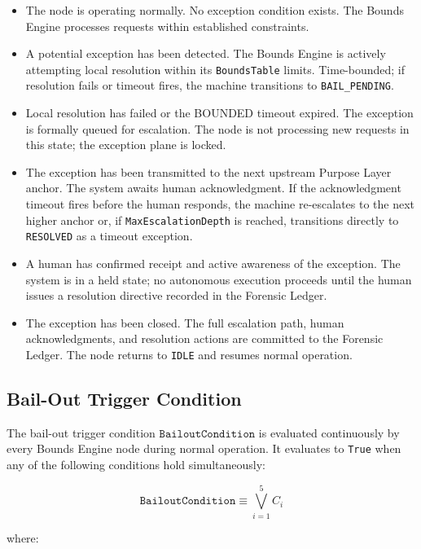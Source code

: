 \begin{itemize}
    \item[\texttt{IDLE}] The node is operating normally. No exception condition exists. The Bounds Engine processes requests within established constraints.
    \item[\texttt{BOUNDED}] A potential exception has been detected. The Bounds Engine is actively attempting local resolution within its \texttt{BoundsTable} limits. Time-bounded; if resolution fails or timeout fires, the machine transitions to \texttt{BAIL\_PENDING}.
    \item[\texttt{BAIL\_PENDING}] Local resolution has failed or the BOUNDED timeout expired. The exception is formally queued for escalation. The node is not processing new requests in this state; the exception plane is locked.
    \item[\texttt{ESCALATING}] The exception has been transmitted to the next upstream Purpose Layer anchor. The system awaits human acknowledgment. If the acknowledgment timeout fires before the human responds, the machine re-escalates to the next higher anchor or, if \texttt{MaxEscalationDepth} is reached, transitions directly to \texttt{RESOLVED} as a timeout exception.
    \item[\texttt{HUMAN\_ACKNOWLEDGED}] A human has confirmed receipt and active awareness of the exception. The system is in a held state; no autonomous execution proceeds until the human issues a resolution directive recorded in the Forensic Ledger.
    \item[\texttt{RESOLVED}] The exception has been closed. The full escalation path, human acknowledgments, and resolution actions are committed to the Forensic Ledger. The node returns to \texttt{IDLE} and resumes normal operation.
\end{itemize}

\subsection{Bail-Out Trigger Condition}

The bail-out trigger condition $\texttt{BailoutCondition}$ is evaluated continuously by every Bounds Engine node during normal operation. It evaluates to \texttt{True} when any of the following conditions hold simultaneously:

\[
\texttt{BailoutCondition} \equiv \bigvee_{i=1}^{5} C_i
\]

where:

